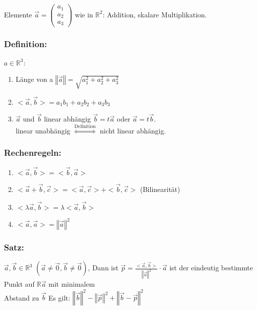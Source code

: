 %
%
%
Elemente $\vec{a} = \begin{pmatrix}a_{1} \\ a_{2} \\ a_{3} \end{pmatrix}$
 wie in $\mathbb{R}^{2}$: Addition, skalare Multiplikation. \\
%
%
%
\subsubsection{Definition:}
$a \in \mathbb{R}^{3}$:
\begin{enumerate}
 \item Länge von a \quad $\left\Vert\vec{a}\right\Vert = \sqrt{a_{1}^{2} + a_{2}^{2} + a_{3}^{2}}$ 
 \item ${<}\vec{a}, \vec{b}{>} = a_{1}b_{1} + a_{2}b_{2} + a_{3}b_{3}$
 \item $ \vec{a}$ und $\vec{b}$ linear abhängig $\vec{b} = t\vec{a}$ oder $\vec{a} = t\vec{b}$.\\
 linear unabhängig $\mathop{\Leftrightarrow}\limits^{\text{Definition}}$ nicht linear abhängig.
\end{enumerate}
%
%
%
\subsubsection{Rechenregeln:}
\begin{enumerate}
 \item ${<}\vec{a}, \vec{b}{>} = {<}\vec{b}, \vec{a}{>}$
 \item ${<}\vec{a} + \vec{b}, \vec{c}{>} = <\vec{a}, \vec{c}> + <\vec{b}, \vec{c}>$ (Bilinearität)
 \item $<\lambda\vec{a}, \vec{b}> = \lambda <\vec{a}, \vec{b}>$
 \item $<\vec{a}, \vec{a}> = \left\Vert\vec{a}\right\Vert^{2}$
\end{enumerate}
%
%
%
\subsubsection{Satz:}
$\vec{a},\vec{b} \in \mathbb{R}^3$ $(\vec{a} \neq \vec{0}, \vec{b} \neq \vec{0})$, 
Dann ist $\vec{p}=\frac{<\vec{a},\vec{b}>}{\left\Vert\vec{a}\right\Vert^{2}} \cdot\vec{a}$
ist der eindeutig bestimmte Punkt auf $\mathbb{R}\vec{a}$ mit minimalem\\
 Abstand zu $\vec{b}$ Es gilt:
$ \left\Vert\vec{b}\right\Vert^{2} - \left\Vert\vec{p}\right\Vert^{2} + \left\Vert\vec{b} - \vec{p}\right\Vert^{2}$
%
%
